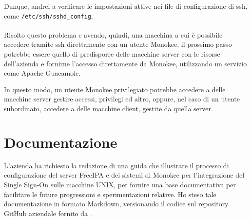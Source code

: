 Dunque, andrei a verificare le impostazioni attive nei file di configurazione di \acrshort{ssh}, come \texttt{/etc/ssh/sshd\_config}.
\\ \\
Risolto questo problema e avendo, quindi, una macchina a cui è possibile accedere tramite \acrshort{ssh} direttamente con un utente Monokee, il prossimo passo potrebbe essere quello di predisporre delle macchine server con le risorse dell'azienda e fornirne l'accesso 
direttamente da Monokee, utilizzando un servizio come Apache Guacamole.

In questo modo, un utente Monokee privilegiato potrebbe accedere a delle macchine server gestire accessi, privilegi ed altro, oppure, nel caso di un utente subordinato, accedere a delle macchine client, gestite da quella server.
\section{Documentazione}

L'azienda ha richiesto la redazione di una guida che illustrare il processo di configurazione del server FreeIPA e dei sistemi di Monokee per l'integrazione del Single Sign-On sulle macchine UNIX, per fornire una base documentativa per facilitare le future progressioni e sperimentazioni relative. Ho steso tale documentazione in formato Markdown, versionando il codice sul repository GitHub aziendale fornito da \myAzienda.